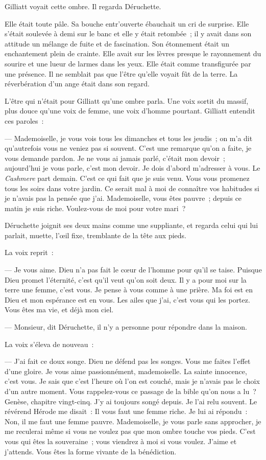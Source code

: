 \documentclass[french,twoside]{book} %
\begin{document}
Gilliatt voyait cette ombre. Il regarda Déruchette.\par
Elle était toute pâle. Sa bouche entr’ouverte ébauchait un cri de surprise. Elle s’était soulevée à demi sur le banc et elle y était retombée ; il y avait dans son attitude un mélange de fuite et de fascination. Son étonnement était un enchantement plein de crainte. Elle avait sur les lèvres presque le rayonnement du sourire et une lueur de larmes dans les yeux. Elle était comme transfigurée par une présence. Il ne semblait pas que l’être qu’elle voyait fût de la terre. La réverbération d’un ange était dans son regard.\par
L’être qui n’était pour Gilliatt qu’une ombre parla. Une voix sortit du massif, plus douce qu’une voix de femme, une voix d’homme pourtant. Gilliatt entendit ces paroles :\par
 — Mademoiselle, je vous vois tous les dimanches et tous les jeudis ; on m’a dit qu’autrefois vous ne veniez pas si souvent. C’est une remarque qu’on a faite, je vous demande pardon. Je ne vous ai jamais parlé, c’était mon devoir ; aujourd’hui je vous parle, c’est mon devoir. Je dois d’abord m’adresser à vous. Le \emph{Cashmere} part demain. C’est ce qui fait que je suis venu. Vous vous promenez tous les soirs dans votre jardin. Ce serait mal à moi de connaître vos habitudes si je n’avais pas la pensée que j’ai. Mademoiselle, vous êtes pauvre ; depuis ce matin je suis riche. Voulez-vous de moi pour votre mari ?\par
Déruchette joignit ses deux mains comme une suppliante, et regarda celui qui lui parlait, muette, l’œil fixe, tremblante de la tête aux pieds.\par
La voix reprit :\par
— Je vous aime. Dieu n’a pas fait le cœur de l’homme pour qu’il se taise. Puisque Dieu promet l’éternité, c’est qu’il veut qu’on soit deux. Il y a pour moi sur la terre une femme, c’est vous. Je pense à vous comme à une prière. Ma foi est en Dieu et mon espérance est en vous. Les ailes que j’ai, c’est vous qui les portez. Vous êtes ma vie, et déjà mon ciel.\par
— Monsieur, dit Déruchette, il n’y a personne pour répondre dans la maison.\par
La voix s’éleva de nouveau :\par
— J’ai fait ce doux songe. Dieu ne défend pas les songes. Vous me faites l’effet d’une gloire. Je vous aime passionnément, mademoiselle. La sainte innocence, c’est vous. Je sais que c’est l’heure où l’on est  couché, mais je n’avais pas le choix d’un autre moment. Vous rappelez-vous ce passage de la bible qu’on nous a lu ? Genèse, chapitre vingt-cinq. J’y ai toujours songé depuis. Je l’ai relu souvent. Le révérend Hérode me disait : Il vous faut une femme riche. Je lui ai répondu : Non, il me faut une femme pauvre. Mademoiselle, je vous parle sans approcher, je me reculerai même si vous ne voulez pas que mon ombre touche vos pieds. C’est vous qui êtes la souveraine ; vous viendrez à moi si vous voulez. J’aime et j’attends. Vous êtes la forme vivante de la bénédiction.\par
\end{document}
